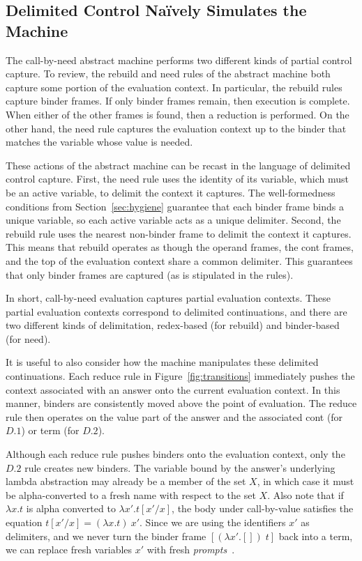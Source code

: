 \documentclass{LMCS}
\theoremstyle{plain}
\theoremstyle{remark}
\begin{document}
\subsection{Delimited Control Na\"ively Simulates the Machine} 

The call-by-need abstract machine performs two different kinds of partial
control capture.  To review, the rebuild and need rules of the abstract machine
both capture some portion of the evaluation context.  In particular, the
rebuild rules capture binder frames.  If only binder frames remain, then
execution is complete.  When either of the other frames is found, then a
reduction is performed.  On the other hand, the need rule captures the
evaluation context up to the binder that matches the variable whose value is
needed.

These actions of the abstract machine can be recast in the language of
delimited control capture.
First, the need rule uses the identity of its variable, which must be an active
variable, to delimit the context it captures. The well-formedness conditions
from Section~\ref{sec:hygiene} guarantee that each binder frame binds a unique
variable, so each active variable acts as a unique delimiter.
Second, the rebuild rule uses the nearest non-binder frame to delimit the
context it captures.  This means that rebuild operates as though the operand
frames, the cont frames, and the top of the evaluation context share a common
delimiter.  This guarantees that only binder frames are captured (as is
stipulated in the rules).

In short, call-by-need evaluation captures partial evaluation contexts.  These
partial evaluation contexts correspond to delimited continuations, and there
are two different kinds of delimitation, redex-based (for rebuild) and 
binder-based (for need). 

It is useful to also consider how the machine manipulates these delimited
continuations.  Each reduce rule in Figure~\ref{fig:transitions} immediately
pushes the context associated with an answer onto the current evaluation
context.  In this manner, binders are consistently moved above the point of
evaluation.  The reduce rule then operates on the value part of the answer and
the associated cont (for $D.1$) or term (for $D.2$).

Although each reduce rule pushes binders onto the evaluation context, only
the $D.2$ rule creates new binders.  The variable bound by the answer's
underlying lambda abstraction may already be a member of the set $X$, in which
case it must be alpha-converted to a fresh name with respect to the set
$X$.  Also note that if $\lambda x.t$ is alpha converted to $\lambda
x'.t[x'/x]$, the body under call-by-value satisfies the equation $t[x'/x] =
(\lambda x.t)\:x'$.  Since we are using the identifiers $x'$ as delimiters,
and we never turn the binder frame $[(\lambda x'.[])\;t]$ back into a term, we
can replace fresh variables $x'$ with fresh \emph{prompts}~\cite{balat04sums}.
\end{document}
